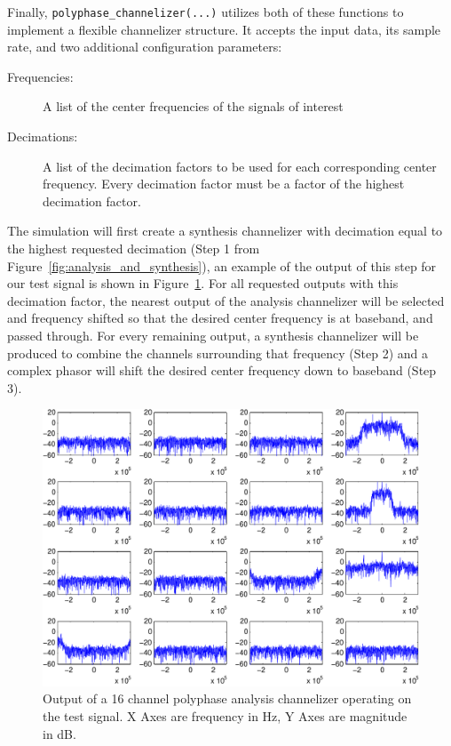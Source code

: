 \documentclass[12pt]{report}
\begin{document}
Finally, \texttt{polyphase\_channelizer(...)} utilizes both of these functions to
implement a flexible channelizer structure.  It accepts the input data, its
sample rate, and two additional configuration parameters:
\begin{description}
    \item[Frequencies:] A list of the center frequencies of the signals of interest
    \item[Decimations:] A list of the decimation factors to be used for each
        corresponding center frequency.  Every decimation factor must be
        a factor of the highest decimation factor.
\end{description}
The simulation will first create a synthesis channelizer with decimation equal
to the highest requested decimation (Step 1 from
Figure~\ref{fig:analysis_and_synthesis}), an example of the output of this step
for our test signal is shown in Figure~\ref{fig:polyphase_splits}.  For all
requested outputs with this decimation factor, the nearest output of the
analysis channelizer will be selected and frequency shifted so that the
desired center frequency is at baseband, and passed through. For every
remaining output, a synthesis channelizer will be produced to combine the
channels surrounding that frequency (Step 2) and a complex phasor will shift
the desired center frequency down to baseband (Step 3).

\begin{figure}[ht!]
    \includegraphics[width=\textwidth]{polyphase_splits}%
    \caption{Output of a 16 channel polyphase analysis channelizer operating on
             the test signal. X Axes are frequency in Hz, Y Axes are magnitude
             in dB.}
    \label{fig:polyphase_splits}
\end{figure}
\end{document}
